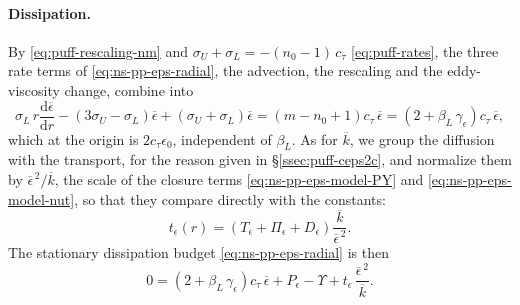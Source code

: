 \documentclass{article}
\begin{document}
\paragraph{Dissipation.}
By \eqref{eq:puff-rescaling-nm} and
$\sigma_U + \sigma_L = -(n_0 - 1)\, c_\tau$ \eqref{eq:puff-rates}, the three
rate terms of \eqref{eq:ns-pp-eps-radial}, the advection, the rescaling and
the eddy-viscosity change, combine into
\begin{equation*}
  \sigma_L\, r \frac{\mathrm{d} \overline{\epsilon}}{\mathrm{d} r}
  - \left( 3\sigma_U - \sigma_L \right) \overline{\epsilon}
  + \left( \sigma_U + \sigma_L \right) \overline{\epsilon}
  = \left( m - n_0 + 1 \right) c_\tau\, \overline{\epsilon}
  = \left( 2 + \beta_L\, \gamma_\epsilon \right) c_\tau\, \overline{\epsilon} ,
\end{equation*}
which at the origin is $2 c_\tau \epsilon_0$, independent of $\beta_L$. As for
$\overline{k}$, we group the diffusion with the transport, for the reason
given in \S\ref{ssec:puff-ceps2c}, and normalize them by
$\overline{\epsilon}^{\,2}/\overline{k}$, the scale of the closure terms
\eqref{eq:ns-pp-eps-model-PY} and \eqref{eq:ns-pp-eps-model-nut}, so that they
compare directly with the constants:
\begin{equation}\label{eq:puff-teps}
  t_\epsilon(r) = \left( T_\epsilon + \Pi_\epsilon + D_\epsilon \right) \frac{\overline{k}}{\overline{\epsilon}^{\,2}} .
\end{equation}
The stationary dissipation budget \eqref{eq:ns-pp-eps-radial} is then
\begin{equation}\label{eq:puff-eps-r}
  0 = \left( 2 + \beta_L\, \gamma_\epsilon \right) c_\tau\, \overline{\epsilon}
  + P_\epsilon - \Upsilon
  + t_\epsilon\, \frac{\overline{\epsilon}^{\,2}}{\overline{k}} .
\end{equation}
\end{document}
